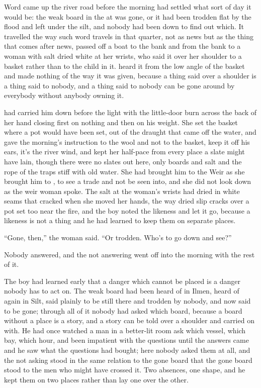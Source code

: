 
Word came up the river road before the morning had settled what sort of day it would be: the weak board in the  at  was gone, or it had been trodden flat by the flood and left under the silt, and nobody had been down to find out which. It travelled the way such word travels in that quarter, not as news but as the thing that comes after news, passed off a boat to the bank and from the bank to a woman with salt dried white at her wrists, who said it over her shoulder to a basket rather than to the child in it.  heard it from the low angle of the basket and made nothing of the way it was given, because a thing said over a shoulder is a thing said to nobody, and a thing said to nobody can be gone around by everybody without anybody owning it.

 had carried him down before the light with the little-door burn across the back of her hand closing first on nothing and then on his weight. She set the basket where a pot would have been set, out of the draught that came off the water, and gave the morning's instruction to the wool and not to the basket, keep it off his ears, it's the river wind, and kept her half-pace from every place a slate might have lain, though there were no slates out here, only boards and salt and the rope of the traps stiff with old water. She had brought him to the Weir as she brought him to , to see a trade and not be seen into, and she did not look down as the weir woman spoke. The salt at the woman's wrists had dried in white seams that cracked when she moved her hands, the way dried slip cracks over a pot set too near the fire, and the boy noted the likeness and let it go, because a likeness is not a thing and he had learned to keep them on separate places.

“Gone, then,” the woman said. “Or trodden. Who's to go down and see?”

Nobody answered, and the not answering went off into the morning with the rest of it.

The boy had learned early that a danger which cannot be placed is a danger nobody has to act on. The weak board had been heard of in Ilmen, heard of again in Silt, said plainly to be still there and trodden by nobody, and now said to be gone; through all of it nobody had asked which board, because a board without a place is a story, and a story can be told over a shoulder and carried on with. He had once watched a man in a better-lit room ask which vessel, which bay, which hour, and been impatient with the questions until the answers came and he saw what the questions had bought; here nobody asked them at all, and the not asking stood in the same relation to the gone board that the gone board stood to the men who might have crossed it. Two absences, one shape, and he kept them on two places rather than lay one over the other.

